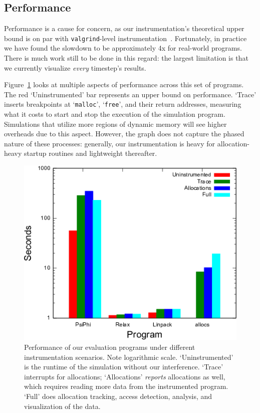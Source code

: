 \subsection{Performance}
\label{inf:sec:performance}

Performance is a cause for concern, as our instrumentation's
theoretical upper
bound is on par with \texttt{valgrind}-level
instrumentation~\cite{Nethercote:2007:Valgrind}.  Fortunately, in
practice we have found the slowdown to be approximately 4x for
real-world programs.  There is much work still to be done in this
regard: the largest
limitation is that we currently visualize \emph{every} timestep's
results.

Figure~\ref{fig:performance} looks at multiple aspects of performance
across this set of programs.  The red `Uninstrumented' bar represents
an upper bound on performance.  `Trace' inserts breakpoints at
`\texttt{malloc}', `\texttt{free}', and their return addresses,
measuring what it costs to start and stop the execution of the
simulation program.  Simulations that utilize more regions of dynamic
memory will see higher overheads due to this aspect.  However, the
graph does not capture the phased nature of these processes: generally,
our instrumentation is heavy for allocation-heavy startup routines and
lightweight thereafter.


\begin{figure}
  \includegraphics[width=\linewidth]{images/dbg/mtrace/performance}

  \caption{Performance of our evaluation programs under different
  instrumentation scenarios. Note logarithmic scale.  `Uninstrumented'
  is the runtime of the simulation without our interference. `Trace'
  interrupts for allocations; `Allocations' \emph{reports} allocations
  as well, which requires reading more data from the instrumented
  program.  `Full' does allocation tracking, access detection,
  analysis, and visualization of the data.}

  \label{fig:performance}
\end{figure}

